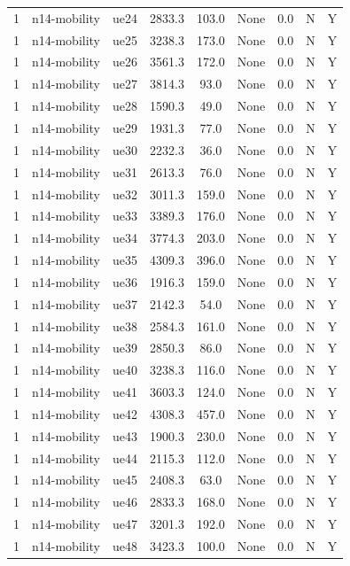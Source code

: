 \begin{table}[ht]
\begin{tabular}{|c|c|c|c|c|c|c|c|c|}
1 & n14-mobility & ue24 & 2833.3 & 103.0 & None & 0.0 & N & Y \\
1 & n14-mobility & ue25 & 3238.3 & 173.0 & None & 0.0 & N & Y \\
1 & n14-mobility & ue26 & 3561.3 & 172.0 & None & 0.0 & N & Y \\
1 & n14-mobility & ue27 & 3814.3 & 93.0 & None & 0.0 & N & Y \\
1 & n14-mobility & ue28 & 1590.3 & 49.0 & None & 0.0 & N & Y \\
1 & n14-mobility & ue29 & 1931.3 & 77.0 & None & 0.0 & N & Y \\
1 & n14-mobility & ue30 & 2232.3 & 36.0 & None & 0.0 & N & Y \\
1 & n14-mobility & ue31 & 2613.3 & 76.0 & None & 0.0 & N & Y \\
1 & n14-mobility & ue32 & 3011.3 & 159.0 & None & 0.0 & N & Y \\
1 & n14-mobility & ue33 & 3389.3 & 176.0 & None & 0.0 & N & Y \\
1 & n14-mobility & ue34 & 3774.3 & 203.0 & None & 0.0 & N & Y \\
1 & n14-mobility & ue35 & 4309.3 & 396.0 & None & 0.0 & N & Y \\
1 & n14-mobility & ue36 & 1916.3 & 159.0 & None & 0.0 & N & Y \\
1 & n14-mobility & ue37 & 2142.3 & 54.0 & None & 0.0 & N & Y \\
1 & n14-mobility & ue38 & 2584.3 & 161.0 & None & 0.0 & N & Y \\
1 & n14-mobility & ue39 & 2850.3 & 86.0 & None & 0.0 & N & Y \\
1 & n14-mobility & ue40 & 3238.3 & 116.0 & None & 0.0 & N & Y \\
1 & n14-mobility & ue41 & 3603.3 & 124.0 & None & 0.0 & N & Y \\
1 & n14-mobility & ue42 & 4308.3 & 457.0 & None & 0.0 & N & Y \\
1 & n14-mobility & ue43 & 1900.3 & 230.0 & None & 0.0 & N & Y \\
1 & n14-mobility & ue44 & 2115.3 & 112.0 & None & 0.0 & N & Y \\
1 & n14-mobility & ue45 & 2408.3 & 63.0 & None & 0.0 & N & Y \\
1 & n14-mobility & ue46 & 2833.3 & 168.0 & None & 0.0 & N & Y \\
1 & n14-mobility & ue47 & 3201.3 & 192.0 & None & 0.0 & N & Y \\
1 & n14-mobility & ue48 & 3423.3 & 100.0 & None & 0.0 & N & Y \\

\end{tabular}
\end{table}

